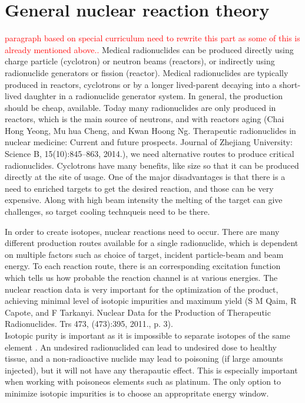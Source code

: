 \documentclass[a4paper,11pt,twoside]{book}
\begin{document}
\chapter{General nuclear reaction theory}

\textcolor{red}{paragraph based on special curriculum}
\textcolor{red}{need to rewrite this part as some of this is already mentioned above.. }
Medical radionuclides can be produced directly using charge particle (cyclotron) or neutron beams (reactors), or indirectly using radionuclide generators or fission (reactor). Medical radionuclides are typically produced in reactors, cyclotrons or by a longer lived-parent decaying into a short-lived daughter in a radionuclide generator system. In general, the production should be cheap, available. Today many radionuclides are only produced in reactors, which is the main source of neutrons, and with reactors aging (Chai Hong Yeong, Mu hua Cheng, and Kwan Hoong Ng. Therapeutic radionuclides in nuclear medicine: Current and future prospects. Journal of Zhejiang University: Science B,
15(10):845–863, 2014.), we need alternative routes to produce critical radionuclides. Cyclotrons have many benefits, like size so that it can be produced directly at the site of usage. One of the major disadvantages is that there is a need to enriched targets to get the desired reaction, and those can be very expensive. Along with high beam intensity the melting of the target can give challenges, so target cooling technqueis need to be there.    

In order to create isotopes, nuclear reactions need to occur. There are many different production routes available for a single radionuclide, which is dependent on multiple factors such as choice of target, incident particle-beam and beam energy. To each reaction route, there is an corresponding excitation function which tells us how probable the reaction channel is at various energies. The nuclear reaction data is very important for the optimization of the product, achieving minimal level of isotopic impurities and maximum yield (S M Qaim, R Capote, and F Tarkanyi. Nuclear Data for the Production of Therapeutic Radionuclides.
Trs 473, (473):395, 2011., p. 3). \\

Isotopic purity is important as it is impossible to separate isotopes of the same element \cite{Qaim2017c}. An undesired radionuclided can lead to undesired dose to healthy tissue, and a non-radioactive nuclide may lead to  poisoning (if large amounts injected), but it will not have any therapautic effect. This is especially important when working with poisoneos elements such as platinum. The only option to minimize isotopic impurities is to choose an appropritate energy window. 
\end{document}
